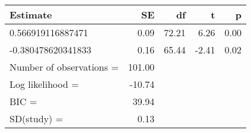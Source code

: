 \begin{table}[ht]
\centering
\begin{tabular}{lrrrr}
  \hline
Estimate & SE & df & t & p \\ 
  \hline
0.566919116887471 & 0.09 & 72.21 & 6.26 & 0.00 \\ 
  -0.380478620341833 & 0.16 & 65.44 & -2.41 & 0.02 \\ 
  Number of observations = & 101.00 &  &  &  \\ 
  Log likelihood = & -10.74 &  &  &  \\ 
  BIC = & 39.94 &  &  &  \\ 
  SD(study) = & 0.13 &  &  &  \\ 
   \hline
\end{tabular}
\end{table}
